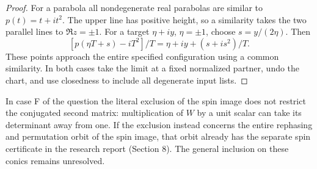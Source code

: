 \documentclass[11pt]{article}
\begin{document}
\begin{proof}
For a parabola all nondegenerate real parabolas are similar to
$p(t)=t+it^2$. The upper line has positive height, so a similarity
takes the two parallel lines to $\Re z=\pm1$. For a target
$\eta+iy$, $\eta=\pm1$, choose $s=y/(2\eta)$. Then
\[
 [p(\eta T+s)-iT^2]/T=\eta+iy+(s+i s^2)/T.
\]
These points approach the entire specified configuration using a
common similarity. In both cases take the limit at a fixed normalized
partner, undo the chart, and use closedness to include all degenerate
input lists.
\end{proof}

In case F of the question the literal exclusion of the spin image does
not restrict the conjugated second matrix: multiplication of $W$ by
a unit scalar can take its determinant away from one. If the exclusion
instead concerns the entire rephasing and permutation orbit of the spin
image, that orbit already has the separate spin certificate in the
research report (Section 8). The general inclusion on these conics
remains unresolved.
\end{document}

